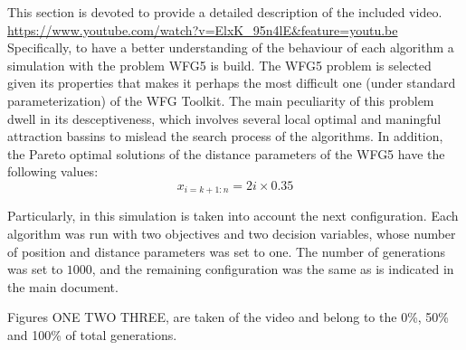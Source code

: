 This section is devoted to provide a detailed description of the included video.
\url{https://www.youtube.com/watch?v=ElxK_95n4lE&feature=youtu.be}
%
Specifically, to have a better understanding of the behaviour of each algorithm a simulation with the problem WFG5 is build.
%
The WFG5 problem is selected given its properties that makes it perhaps the most difficult one (under standard parameterization) of the WFG Toolkit.
%
The main peculiarity of this problem dwell in its desceptiveness, which involves several local optimal and maningful attraction bassins to mislead the search process of the algorithms.
%
In addition, the Pareto optimal solutions of the distance parameters of the WFG5 have the following values:
%
\begin{equation}
   x_{i=k+1:n} = 2i \times 0.35
\end{equation}

Particularly, in this simulation is taken into account the next configuration.
%
Each algorithm was run with two objectives and two decision variables, whose number of position and distance parameters was set to one.
%
The number of generations was set to $1000$, and the remaining configuration was the same as is indicated in the main document.
%

Figures ONE TWO THREE, are taken of the video and belong to the 0\%, 50\% and 100\% of total generations.


